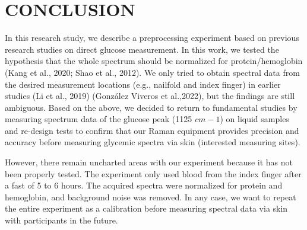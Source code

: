 \setlength{\footskip}{8mm}

\chapter{CONCLUSION}

In this research study, we describe a preprocessing experiment based on previous research studies on direct glucose measurement. In this work, we tested the hypothesis that the whole spectrum should be normalized for protein/hemoglobin (Kang et al., 2020; Shao et al., 2012). We only tried to obtain spectral data from the desired measurement locations (e.g., nailfold and index finger) in earlier studies (Li et al., 2019) (González Viveros et al.,2022), but the findings are still ambiguous. Based on the above, we decided to return to fundamental studies by measuring spectrum data of the glucose peak (1125 $cm-1$) on liquid samples and re-design tests to confirm that our Raman equipment provides precision and accuracy before measuring glycemic spectra via skin (interested measuring sites).


However, there remain uncharted areas with our experiment because it has not been properly tested. The experiment only used blood from the index finger after a fast of 5 to 6 hours. The acquired spectra were normalized for protein and hemoglobin, and background noise was removed. In any case, we want to repeat the entire experiment as a calibration before measuring spectral data via skin with participants in the future.


